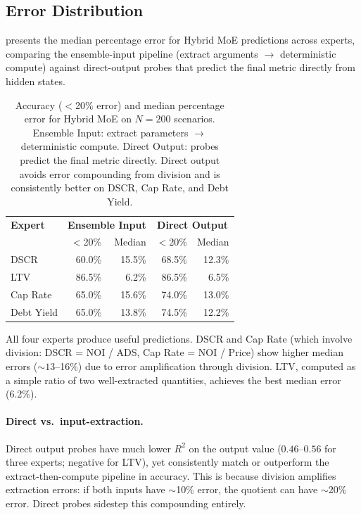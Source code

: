 \subsection{Error Distribution}
\label{sec:exp:error}

 presents the median percentage error for Hybrid
MoE predictions across experts, comparing the ensemble-input pipeline
(extract arguments $\to$ deterministic compute) against direct-output
probes that predict the final metric directly from hidden states.

\begin{table}[t]
\centering
\begin{tabular}{@{}lrrrr@{}}
\toprule
\textbf{Expert} & \multicolumn{2}{c}{\textbf{Ensemble Input}} & \multicolumn{2}{c}{\textbf{Direct Output}} \\
               & $<$20\% & Median & $<$20\% & Median \\
\midrule
DSCR       & 60.0\% & 15.5\% & 68.5\% & 12.3\% \\
LTV        & 86.5\% & 6.2\%  & 86.5\% & 6.5\%  \\
Cap Rate   & 65.0\% & 15.6\% & 74.0\% & 13.0\% \\
Debt Yield & 65.0\% & 13.8\% & 74.5\% & 12.2\% \\
\bottomrule
\end{tabular}
\caption{Accuracy ($<$20\% error) and median percentage error for
Hybrid MoE on $N{=}200$ scenarios. Ensemble Input: extract parameters
$\to$ deterministic compute. Direct Output: probes predict the final
metric directly. Direct output avoids error compounding from division
and is consistently better on DSCR, Cap Rate, and Debt Yield.}
\label{tab:error_dist}
\end{table}

All four experts produce useful predictions. DSCR and Cap Rate (which
involve division: DSCR = NOI / ADS, Cap Rate = NOI / Price) show
higher median errors (${\sim}13$--16\%) due to error amplification
through division. LTV, computed as a simple ratio of two
well-extracted quantities, achieves the best median error (6.2\%).

\paragraph{Direct vs.\ input-extraction.} Direct output probes
have much lower $R^2$ on the output value ($0.46$--$0.56$ for three
experts; negative for LTV), yet consistently match or outperform the
extract-then-compute pipeline in accuracy. This is because division
amplifies extraction errors: if both inputs have ${\sim}$10\% error,
the quotient can have ${\sim}$20\% error. Direct probes sidestep this
compounding entirely.
